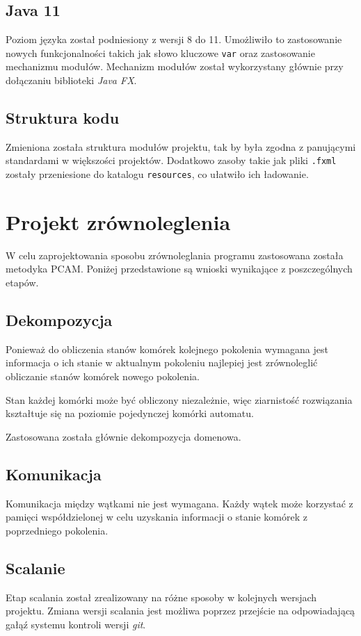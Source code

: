 \documentclass{mwart}
\begin{document}
\subsection*{Java 11}
Poziom języka został podniesiony z wersji 8 do 11. Umożliwiło to zastosowanie nowych funkcjonalności takich jak słowo kluczowe \texttt{var} oraz zastosowanie mechanizmu modułów.
Mechanizm modułów został wykorzystany głównie przy dołączaniu biblioteki \textit{Java FX}.

\subsection*{Struktura kodu}
Zmieniona została struktura modułów projektu, tak by była zgodna z panującymi standardami w większości projektów. Dodatkowo zasoby takie jak pliki \texttt{.fxml} zostały przeniesione do katalogu \texttt{resources}, co ułatwiło ich ładowanie.

\section{Projekt zrównoleglenia}
W celu zaprojektowania sposobu zrównoleglania programu zastosowana została metodyka PCAM. Poniżej przedstawione są wnioski wynikające z poszczególnych etapów.

\subsection{Dekompozycja}
Ponieważ do obliczenia stanów komórek kolejnego pokolenia wymagana jest informacja o ich stanie w aktualnym pokoleniu najlepiej jest zrównoleglić obliczanie stanów komórek nowego pokolenia.

Stan każdej komórki może być obliczony niezależnie, więc ziarnistość rozwiązania kształtuje się na poziomie pojedynczej komórki automatu.

Zastosowana została głównie dekompozycja domenowa.

\subsection{Komunikacja}
Komunikacja między wątkami nie jest wymagana. Każdy wątek może korzystać z pamięci współdzielonej w celu uzyskania informacji o stanie komórek z poprzedniego pokolenia.

\subsection{Scalanie}
Etap scalania został zrealizowany na różne sposoby w kolejnych wersjach projektu. Zmiana wersji scalania jest możliwa poprzez przejście na odpowiadającą gałąź systemu kontroli wersji \textit{git}.
\end{document}
